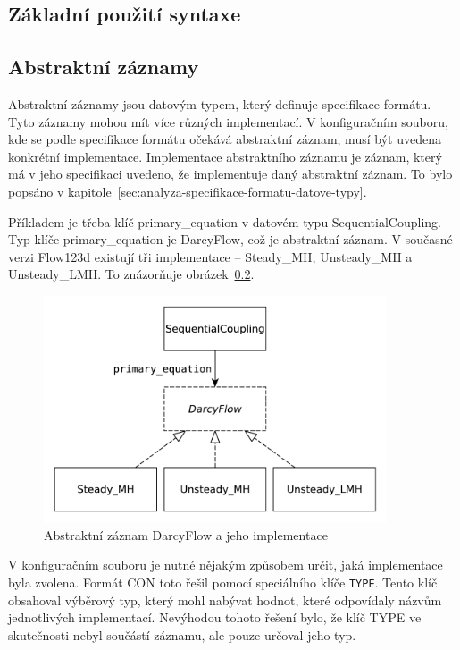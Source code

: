\documentclass[FM,bw,DP]{tulthesis}
\begin{document}
\subsection{Základní použití syntaxe}


\subsection{Abstraktní záznamy}

Abstraktní záznamy jsou datovým typem, který definuje specifikace formátu. Tyto záznamy mohou mít více různých implementací. V konfiguračním souboru, kde se podle specifikace formátu očekává abstraktní záznam, musí být uvedena konkrétní implementace. Implementace abstraktního záznamu je záznam, který má v jeho specifikaci uvedeno, že implementuje daný abstraktní záznam. To bylo popsáno v kapitole~\ref{sec:analyza-specifikace-formatu-datove-typy}.

Příkladem je třeba klíč primary\_equation v datovém typu SequentialCoupling. Typ klíče primary\_equation je DarcyFlow, což je abstraktní záznam. V současné verzi Flow123d existují tři implementace -- Steady\_MH, Unsteady\_MH a Unsteady\_LMH. To znázorňuje obrázek~\ref{}.

\begin{figure}[h]
	\centering
    \includegraphics[height=190pt]{../img/abstract_record_darcyflow.pdf}
    \caption{Abstraktní záznam DarcyFlow a jeho implementace}
	\label{img:abstract_record_darcyflow}
\end{figure}

V konfiguračním souboru je nutné nějakým způsobem určit, jaká implementace byla zvolena. Formát CON toto řešil pomocí speciálního klíče \texttt{TYPE}. Tento klíč obsahoval výběrový typ, který mohl nabývat hodnot, které odpovídaly názvům jednotlivých implementací. Nevýhodou tohoto řešení bylo, že klíč TYPE ve skutečnosti nebyl součástí záznamu, ale pouze určoval jeho typ.
\end{document}
